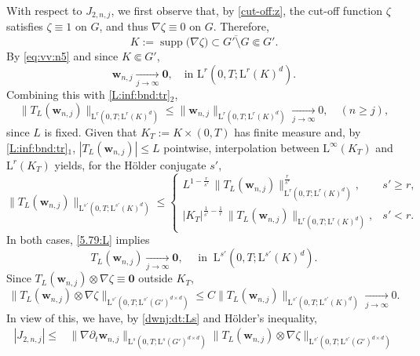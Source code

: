 \documentclass[12pt,reqno]{amsart}
\numberwithin{equation}{section}
\theoremstyle{definition}
\def\supp{\operatorname{supp}}
\def\L{\mathrm{L}}
\def\w{\boldsymbol{w}}
\def\00{\boldsymbol{0}}
\def\bf0{\mathbf{0}}
\begin{document}
{{{With respect to $J_{2,n,j}$, we first observe that, by \eqref{cut-off:z},
the cut-off function $\zeta$ satisfies $\zeta\equiv 1$ on $G$, and thus $\nabla\zeta\equiv 0$ on $G$.
Therefore,
\begin{equation*}
K:=\supp\big(\nabla\zeta\big)\subset \overline{G'\setminus G}\Subset G'.
\end{equation*}
By \eqref{eq:vv:n5} and since $K\Subset G'$,
\begin{equation*}
\w_{n,j}\xrightarrow[j\to\infty]{}\bf 0, \quad\text{in } \L^{r}(0,T;\L^{r}(K)^d).
\end{equation*}
Combining this with \eqref{L:inf:bnd:tr}$_2$,
\begin{equation}\label{5.79:L}
\|T_L(\w_{n,j})\|_{\L^{r}(0,T;\L^{r}(K)^d)}
\leq \|\w_{n,j}\|_{\L^{r}(0,T;\L^{r}(K)^d)}
\xrightarrow[j\to\infty]{}0, \quad (n\geq j),
\end{equation}
since $L$ is fixed.
Given that $K_T:=K\times(0,T)$ has finite measure and, by \eqref{L:inf:bnd:tr}$_1$, $|T_L(\w_{n,j})|\leq L$ pointwise, interpolation between $\L^\infty(K_T)$ and $\L^r(K_T)$ yields, for the H\"older conjugate $s'$,
\begin{equation*}
\|T_L(\w_{n,j})\|_{\L^{s'}(0,T;\L^{s'}(K)^d)}\leq
\begin{cases}
L^{1-\frac{r}{s'}}\,\|T_L(\w_{n,j})\|_{\L^{r}(0,T;\L^{r}(K)^d)}^{\frac{r}{s'}}, & s'\geq r,\\[2mm]
|K_T|^{\frac{1}{s'}-\frac{1}{r}}\,\|T_L(\w_{n,j})\|_{\L^{r}(0,T;\L^{r}(K)^d)}, & s'< r.
\end{cases}
\end{equation*}
In both cases, \eqref{5.79:L} implies
\begin{equation*}
T_L(\w_{n,j})\xrightarrow[j\to\infty]{}\bf 0, \quad\text{ in }\ \L^{s'}(0,T;\L^{s'}(K)^d).
\end{equation*}
Since $T_L(\w_{n,j})\otimes\nabla\zeta\equiv \00$ outside $K_T$,
\begin{equation*}
\|T_L(\w_{n,j})\otimes\nabla\zeta\|_{\L^{s'}(0,T;\L^{s'}(G')^{d\times d})}
\leq C\|T_L(\w_{n,j})\|_{\L^{s'}(0,T;\L^{s'}(K)^d)}
\xrightarrow[j\to\infty]{}0.
\end{equation*}
In view of this, we have, by \eqref{dwnj:dt:Ls} and H\"older's inequality,
\begin{equation}\label{est:J2:n:j}
\begin{split}
|J_{2,n,j}|\leq & \|\nabla\partial_t \w_{n,j}\|_{\L^s(0,T;\L^s(G')^{d\times d })}\|T_L(\w_{n,j})\otimes\nabla\zeta\|_{\L^{s'}(0,T;\L^{s'}(G')^{d\times d})} \\

\end{split}
\end{equation}}}}
\end{document}
